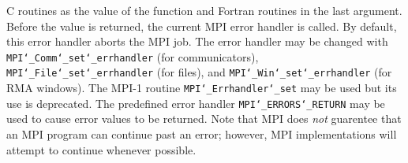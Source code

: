 C routines as the value of the function and Fortran routines in the last
argument.  Before the value is returned, the current MPI error handler is
called.  By default, this error handler aborts the MPI job.  The error handler
may be changed with {\tt MPI{\tt \char`\_}Comm{\tt \char`\_}set{\tt \char`\_}errhandler} (for communicators),
{\tt MPI{\tt \char`\_}File{\tt \char`\_}set{\tt \char`\_}errhandler} (for files), and {\tt MPI{\tt \char`\_}Win{\tt \char`\_}set{\tt \char`\_}errhandler} (for
RMA windows).  The MPI-1 routine {\tt MPI{\tt \char`\_}Errhandler{\tt \char`\_}set} may be used but
its use is deprecated.  The predefined error handler
{\tt MPI{\tt \char`\_}ERRORS{\tt \char`\_}RETURN} may be used to cause error values to be returned.
Note that MPI does {\em not} guarentee that an MPI program can continue past
an error; however, MPI implementations will attempt to continue whenever
possible.
\par
{}
\endmanpage
